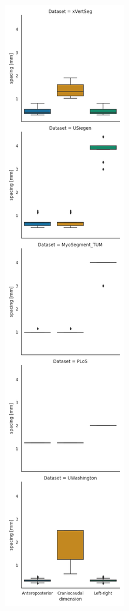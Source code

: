 \begin{figure}
\begin{minipage}{.45\textwidth}
    \end{minipage}%
    \begin{minipage}{0.45\textwidth}
        \includegraphics[width=.98\textwidth]{automated_graphs/AllDataset_SpacingBoxplot.png}

\end{minipage}
\end{figure}
